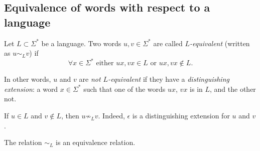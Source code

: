 \begin{page}
\setcounter{section}{4}
\setcounter{subsection}{1}
\setcounter{dfn}{0}
\label{portion:1172}

\subsection{Equivalence of words with respect to a language}

\end{page}

\begin{page}
\setcounter{section}{4}
\setcounter{subsection}{1}
\setcounter{dfn}{1}
\label{portion:1174}

\begin{dfn}
Let $L \subset \Sigma^*$ be a language.
Two words $u, v \in \Sigma^*$ are called \emph{$L$-equivalent} (written as $u \sim_L v$) if
\[
\forall x \in \Sigma^* \text{ either } ux, vx \in L \text{ or } ux, vx \notin L.
\]
\end{dfn}

\end{page}

\begin{page}
\setcounter{section}{4}
\setcounter{subsection}{1}
\setcounter{dfn}{1}
\label{portion:1175}


In other words, $u$ and $v$ are \emph{not $L$-equivalent} if they have a \emph{distinguishing extension}:
a word $x \in \Sigma^*$ such that one of the words $ux$, $vx$ is in $L$, and the other not.


\end{page}

\begin{page}
\setcounter{section}{4}
\setcounter{subsection}{1}
\setcounter{dfn}{2}
\label{portion:1177}

\begin{exl}
\label{exl:LEquiv}
If $u \in L$ and $v \notin L$, then $u \not\sim_L v$.
Indeed, $\epsilon$ is a distinguishing extension for $u$ and $v$.
\end{exl}

\end{page}

\begin{page}
\setcounter{section}{4}
\setcounter{subsection}{1}
\setcounter{dfn}{3}
\label{portion:1180}

\begin{lem}
The relation $\sim_L$ is an equivalence relation.
\end{lem}

\end{page}

